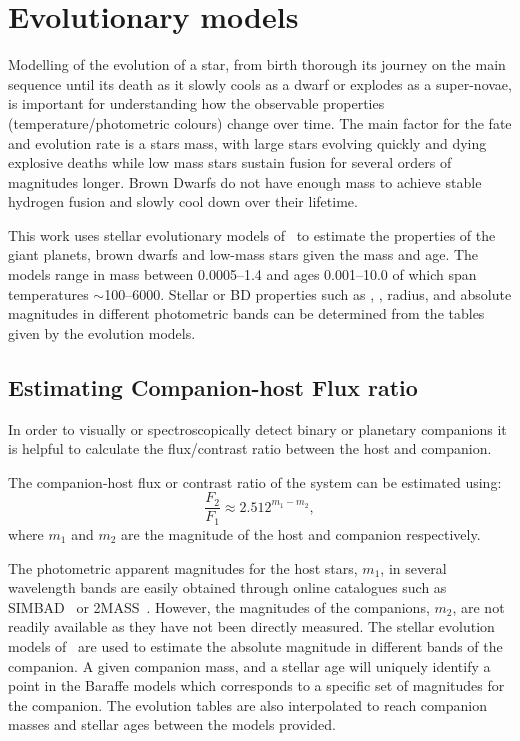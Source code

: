
\section{Evolutionary models}
\label{sec:evolutionary_models}
Modelling of the evolution of a star, from birth thorough its journey on the main sequence until its death as it slowly cools as a dwarf or explodes as a super-novae, is important for understanding how the observable properties  (temperature/photometric colours) change over time.
The main factor for the fate and evolution rate is a stars mass, with large stars evolving quickly and dying explosive deaths while low mass stars sustain fusion for several orders of magnitudes longer.
Brown Dwarfs do not have enough mass to achieve stable hydrogen fusion and slowly cool down over their lifetime.

This work uses stellar evolutionary models of~\citet{baraffe_evolutionary_2003, baraffe_new_2015} to estimate the properties of the giant planets, brown dwarfs and low-mass stars given the mass and age.
The models range in mass between 0.0005--1.4\Msun{} and ages 0.001--10.0\Gyr{} of which span temperatures $\sim$100--6000\K{}.
Stellar or {BD} properties such as \Teff{}, \Logg{}, radius, and absolute magnitudes in different photometric bands can be determined from the tables given by the evolution models.

\subsection{Estimating Companion-host Flux ratio}
\label{subsec:compaion_flux_ratio}
In order to visually or spectroscopically detect binary or planetary companions it is helpful to calculate the flux/contrast ratio between the host and companion.

The companion-host flux or contrast ratio of the system can be estimated using:
\begin{equation}
\frac{F_{2}}{F_{1}} \approx 2.512^{m_{1} - m_{2}}, \label{eqn:mag_flux_ratios}
\end{equation}
where \(m_{1}\) and \(m_{2}\) are the magnitude of the host and companion respectively.

The photometric apparent magnitudes for the host stars, \(m_{1}\), in several wavelength bands are easily obtained through online catalogues such as {SIMBAD}~\citep{wenger_simbad_2000} or {2MASS}~\citep{skrutskie_two_2006}.
However, the magnitudes of the companions, \(m_{2}\), are not readily available as they have not been directly measured.
The stellar evolution models of~\citet{baraffe_evolutionary_2003, baraffe_new_2015} are used to estimate the absolute magnitude in different bands of the companion.
A given companion mass, and a stellar age will uniquely identify a point in the Baraffe models which corresponds to a specific set of magnitudes for the companion.
The evolution tables are also interpolated to reach companion masses and stellar ages between the models provided.

